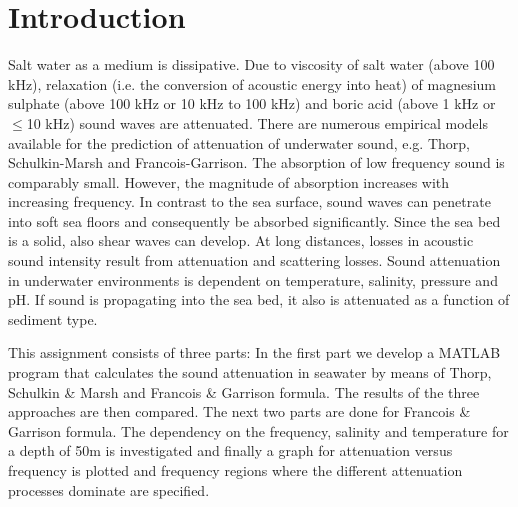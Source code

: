  \chapter{Introduction}  \label{Introduction}



\noindent Salt water as a medium is dissipative. Due to viscosity of salt water (above 100 kHz), relaxation (i.e. the conversion of acoustic energy into heat) of magnesium sulphate (above 100 kHz or 10 kHz to 100 kHz) and boric acid (above 1 kHz or $\leq$10 kHz) sound waves are attenuated. There are numerous empirical models available for the prediction of attenuation of underwater sound, e.g. Thorp, Schulkin-Marsh and Francois-Garrison. The absorption of low frequency sound is comparably small. However, the magnitude of absorption increases with increasing frequency. In contrast to the sea surface, sound waves can penetrate into soft sea floors and consequently be absorbed significantly. Since the sea bed is a solid, also shear waves can develop. At long distances, losses in acoustic sound intensity result from attenuation and scattering losses. Sound attenuation in underwater environments is dependent on temperature, salinity, pressure and pH. If sound is propagating into the sea bed, it also is attenuated as a function of sediment type.

\noindent This assignment consists of three parts: In the first part we develop a MATLAB program that calculates the sound attenuation in seawater by means of Thorp, Schulkin \& Marsh and Francois \& Garrison formula. The results of the three approaches are then compared. The next two parts are done for Francois \& Garrison formula. The dependency on the frequency, salinity and temperature for a depth of 50m is investigated and finally a graph for attenuation versus frequency is plotted and frequency regions where the different attenuation processes dominate are specified.






